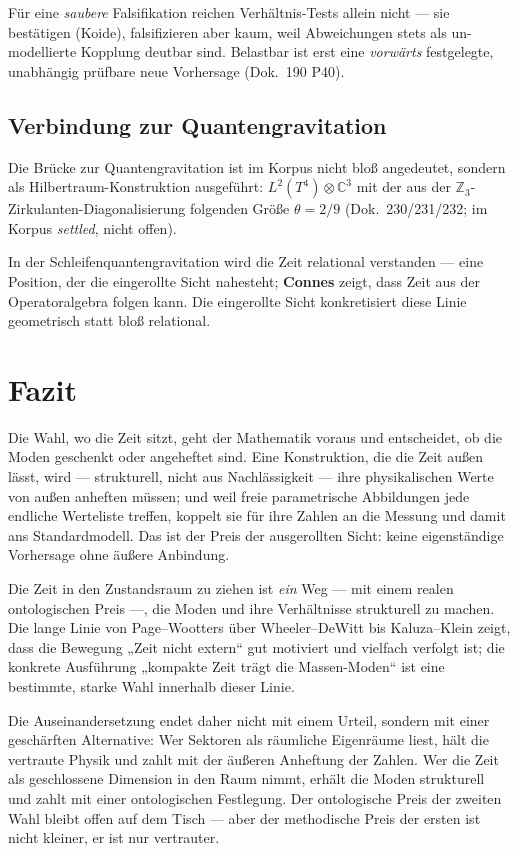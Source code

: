 Für eine \emph{saubere} Falsifikation reichen Verhältnis-Tests allein nicht --- sie bestätigen (Koide), falsifizieren aber kaum, weil Abweichungen stets als un-modellierte Kopplung deutbar sind. Belastbar ist erst eine \emph{vorwärts} festgelegte, unabhängig prüfbare neue Vorhersage (Dok.~190 P40).

\subsection{Verbindung zur Quantengravitation}

Die Brücke zur Quantengravitation ist im Korpus nicht bloß angedeutet, sondern als Hilbertraum-Konstruktion ausgeführt: $L^2(T^4)\otimes\mathbb{C}^3$ mit der aus der $\mathbb{Z}_3$-Zirkulanten-Diagonalisierung folgenden Größe $\theta = 2/9$ (Dok.~230/231/232; im Korpus \emph{settled}, nicht offen).

In der Schleifenquantengravitation wird die Zeit relational verstanden --- eine Position, der die eingerollte Sicht nahesteht; \textbf{Connes} zeigt, dass Zeit aus der Operatoralgebra folgen kann. Die eingerollte Sicht konkretisiert diese Linie geometrisch statt bloß relational.

\section{Fazit}

Die Wahl, wo die Zeit sitzt, geht der Mathematik voraus und entscheidet, ob die Moden geschenkt oder angeheftet sind. Eine Konstruktion, die die Zeit außen lässt, wird --- strukturell, nicht aus Nachlässigkeit --- ihre physikalischen Werte von außen anheften müssen; und weil freie parametrische Abbildungen jede endliche Werteliste treffen, koppelt sie für ihre Zahlen an die Messung und damit ans Standardmodell. Das ist der Preis der ausgerollten Sicht: keine eigenständige Vorhersage ohne äußere Anbindung.

Die Zeit in den Zustandsraum zu ziehen ist \emph{ein} Weg --- mit einem realen ontologischen Preis ---, die Moden und ihre Verhältnisse strukturell zu machen. Die lange Linie von Page--Wootters über Wheeler--DeWitt bis Kaluza--Klein zeigt, dass die Bewegung „Zeit nicht extern`` gut motiviert und vielfach verfolgt ist; die konkrete Ausführung „kompakte Zeit trägt die Massen-Moden`` ist eine bestimmte, starke Wahl innerhalb dieser Linie.

Die Auseinandersetzung endet daher nicht mit einem Urteil, sondern mit einer geschärften Alternative: Wer Sektoren als räumliche Eigenräume liest, hält die vertraute Physik und zahlt mit der äußeren Anheftung der Zahlen. Wer die Zeit als geschlossene Dimension in den Raum nimmt, erhält die Moden strukturell und zahlt mit einer ontologischen Festlegung. Der ontologische Preis der zweiten Wahl bleibt offen auf dem Tisch --- aber der methodische Preis der ersten ist nicht kleiner, er ist nur vertrauter.

